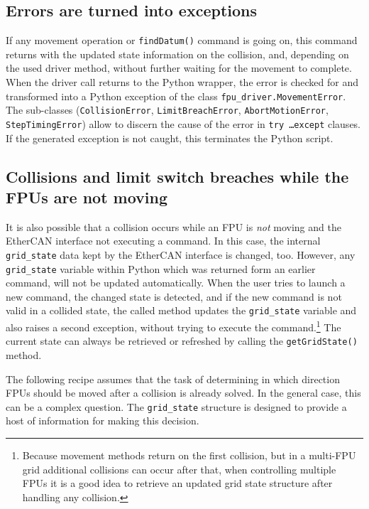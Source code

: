 \documentclass[fontsize=12,a4paper]{scrreprt}
\begin{document}
\subsection{Errors are turned into exceptions}

\begin{sloppypar}
If any movement operation or \texttt{findDatum()} command is going on,
this command returns with the updated state information on the
collision, and, depending on the used driver method, without further
waiting for the movement to complete.  When the driver call returns to
the Python wrapper, the error is checked for and transformed into a
Python exception of the class \texttt{fpu\_driver.MovementError}. The
sub-classes (\texttt{CollisionError}, \texttt{LimitBreachError},
\texttt{AbortMotionError}, \texttt{StepTimingError}) allow to discern
the cause of the error in \texttt{try \ldots except} clauses.  If the
generated exception is not caught, this terminates the Python script.
\end{sloppypar}

\subsection{Collisions and limit switch breaches while the FPUs are not moving}
 It is also possible that
a collision occurs while an FPU is \emph{not} moving and the EtherCAN interface
not executing a command.  In this case, the internal
\texttt{grid\_state} data kept by the EtherCAN interface is changed, too. However,
any \texttt{grid\_state} variable within Python which was returned
form an earlier command, will not be updated automatically. When the
user tries to launch a new command, the changed state is detected, and
if the new command is not valid in a collided state, the called method
updates the \texttt{grid\_state} variable and also raises a second
exception, without trying to execute the command.\footnote{Because
  movement methods return on the first collision, but in a multi-FPU
  grid additional collisions can occur after that, when controlling
  multiple FPUs it is a good idea to retrieve an updated grid state
  structure after handling any collision.}  The current state can
always be retrieved or refreshed by calling the
\texttt{getGridState()} method.

The following recipe assumes that the task of determining in which
direction FPUs should be moved after a collision is already solved.
In the general case, this can be a complex question. The
\texttt{grid\_state} structure is designed to provide a host of
information for making this decision.
\end{document}

